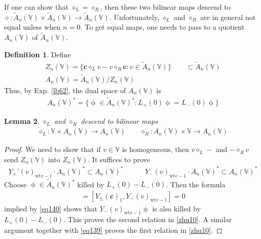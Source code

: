 \documentclass[11pt,b5paper,notitlepage]{article}
\theoremstyle{definition}
\newtheorem{df}{Definition}[section]
\theoremstyle{plain}
\newtheorem{lm}[df]{Lemma}
\newcommand{\wtd}{\widetilde}
\newcommand{\Vbb}{\mathbb V}
\newcommand{\cbf}{\mathbf c}
\newcommand{\wt}{\mathrm{wt}}
\newcommand{\<}{\left\langle}
\renewcommand{\>}{\right\rangle}
\numberwithin{equation}{section}
\begin{document}
If one can show that $\diamond_L=\diamond_R$, then these two bilinear maps descend to $\diamond:\wtd A_n(\Vbb)\times\wtd A_n(\Vbb)\rightarrow\wtd A_n(\Vbb)$. Unfortunately, $\diamond_L$ and $\diamond_R$ are in general not equal unless when $n=0$. To get equal maps, one needs to pass to a quotient $A_n(\Vbb)$ of $\wtd A_n(\Vbb)$.


\begin{df}
Define
\begin{subequations}\label{eq152}
\begin{gather}
Z_n(\Vbb)=\big\{\cbf\diamond_L v-v\diamond_R\cbf:v\in \wtd A_n(\Vbb)\big\}\qquad\subset \wtd A_n(\Vbb)\\[0.5ex]
A_n(\Vbb)=\wtd A_n(\Vbb)/Z_n(\Vbb)
\end{gather}
\end{subequations}
Thus, by Exp. \ref{lb62}, the dual space of $A_n(\Vbb)$ is
\begin{align}
A_n(\Vbb)^*=\big\{\upphi\in \wtd A_n(\Vbb)^*: L_+(0)\upphi= L_-(0)\upphi  \big\} \label{eq146}
\end{align}
\end{df}


\begin{lm}\label{zhu11}
$\diamond_L$ and $\diamond_R$ descend to bilinear maps
\begin{align}
\diamond_L:\Vbb\times A_n(\Vbb)\rightarrow A_n(\Vbb)\qquad \diamond_R: A_n(\Vbb)\times\Vbb\rightarrow A_n(\Vbb)   \label{eq143}
\end{align}
\end{lm}

     \begin{proof}
We need to show that if $v\in\Vbb$ is homogeneous, then $v\diamond_L-$ and $-\diamond_R v$ send $Z_n(\Vbb)$ into $Z_n(\Vbb)$. It suffices to prove
         \begin{align}\label{zhu10}
             Y_+'(v)_{\wt v-1}\cdot A_n(\Vbb)^*\subset A_n(\Vbb)^*\qquad\quad Y_-(v)_{\wt v-1}\cdot A_n(\Vbb)^*\subset A_n(\Vbb)^*
         \end{align}
Choose $\upphi\in\wtd A_n(\Vbb)^*$  killed by $L_+(0)-L_-(0)$. Then the formula
\begin{align*}
[L_\pm(0),Y_-(v)_{\wt v-1}]=[Y_\pm(\cbf)_1,Y_-(v)_{\wt v-1}]=0
\end{align*}
implied by \eqref{eq140} shows that $Y_-(v)_{\wt v-1}\upphi$ is also killed by $L_+(0)-L_-(0)$. This proves the second relation in \eqref{zhu10}. A similar argument together with \eqref{eq139} proves the first relation in \eqref{zhu10}.
     \end{proof}
\end{document}
